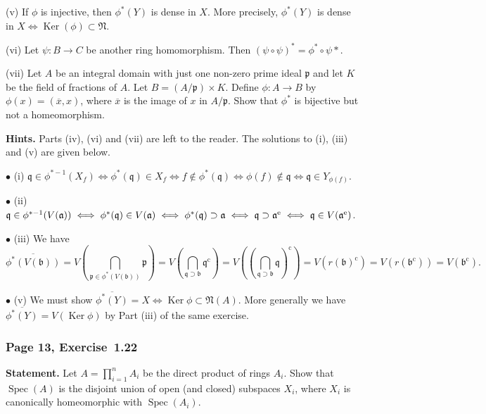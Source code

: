 \documentclass[12pt,letterpaper]{article}%
\newcommand{\oo}{\operatorname}\newcommand{\ooo}{\operatorname*}
\newcommand{\mf}{\mathfrak}
\newcommand{\aaa}{\mf a}
\newcommand{\bbb}{\mf b}
\newcommand{\ppp}{\mf p}
\newcommand{\qqq}{\mf q}
\newcommand{\NNN}{\mf N}\newcommand{\RRR}{\mf R}
\newcommand{\ov}{\overline}
\newcommand{\bu}{\bullet}
\newcommand{\Ker}{\operatorname{Ker}}\newcommand{\Coker}{\operatorname{Coker}}
\newcommand{\Spec}{\operatorname{Spec}}\newcommand{\Sp}{\operatorname{Spec}}
\newcommand{\nn}{\noindent}
\newtheorem{prop}[thm]{Proposition}
\begin{document}
\nn(v) If $\phi$ is injective, then $\phi^*(Y)$ is dense in $X$. More precisely, $\phi^*(Y)$ is dense in $X\iff\Ker(\phi)\subset\NNN$.

\nn(vi) Let $\psi:B\to C$ be another ring homomorphism. Then $(\psi\circ\psi)^*=\phi^*\circ\psi*$.

\nn(vii) Let $A$ be an integral domain with just one non-zero prime ideal $\ppp$ and let $K$ be the field of fractions of $A$. Let $B=(A/\ppp)\times K$. Define $\phi:A\to B$ by $\phi(x)=(\ov x,x)$, where $\ov x$ is the image of $x$ in $A/\ppp$. Show that $\phi^*$ is bijective but not a homeomorphism.

\nn\textbf{Hints.} Parts (iv), (vi) and (vii) are left to the reader. The solutions to (i), (iii) and (v) are given below.

\nn$\bu$ (i) $\qqq\in\phi^{*-1}(X_f)\iff\phi^*(\qqq)\in X_f\iff f\notin\phi^*(\qqq)\iff\phi(f)\notin\qqq\iff\qqq\in Y_{\phi(f)}$.

\nn$\bu$ (ii) $\qqq\in\phi^{*-1}(V(\aaa))\iff\phi^*(\qqq)\in V(\aaa)\iff\phi^*(\qqq)\supset\aaa\iff\qqq\supset\aaa^{\text e}\iff\qqq\in V(\aaa^{\text e})$.

\nn$\bu$ (iii) We have 
$$
\overline{\phi^*(V(\bbb))}=V\left(\bigcap_{\ppp\in\phi^*(V(\bbb))}\ppp\right)=V\left(\bigcap_{\qqq\supset\bbb}\qqq^{\oo c}\right)=V\left(\left(\bigcap_{\qqq\supset\bbb}\qqq\right)^{\oo c}\right)=V(r(\bbb)^{\oo c})=V(r(\bbb^{\oo c}))=V(\bbb^{\oo c}).
$$

\nn$\bu$ (v) We must show $\overline{\phi^*(Y)}=X\iff\Ker\phi\subset\NNN(A)$. More generally we have $\overline{\phi^*(Y)}=V(\Ker\phi)$ by Part (iii) of the same exercise.

\subsubsection{Page 13, Exercise~1.22}\label{ex1.22}%

\textbf{Statement.} Let $A=\prod_{i=1}^nA_i$ be the direct product of rings $A_i$. Show that $\Spec(A)$ is the disjoint union of open (and closed) subspaces $X_i$, where $X_i$ is canonically homeomorphic with $\Spec(A_i)$.
\end{document}
